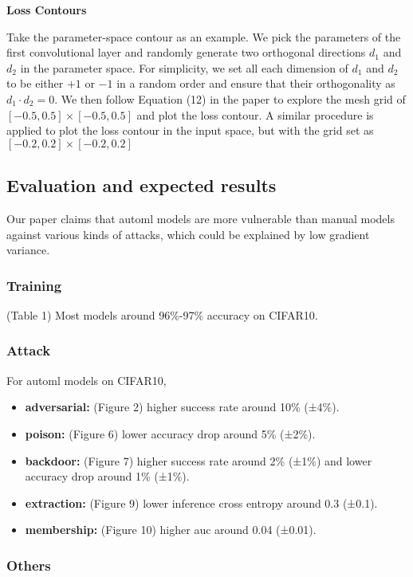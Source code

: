 \documentclass[letterpaper,twocolumn,10pt]{article}
\begin{document}
{{{{{\noindent
\textbf{Loss Contours}

Take the parameter-space contour as an example. We pick the parameters of the first convolutional layer and randomly generate two orthogonal directions $d_1$ and $d_2$ in the parameter space. For simplicity, we set all each dimension of $d_1$ and $d_2$ to be either $+1$ or $-1$ in a random order and ensure that their orthogonality as $d_1 \cdot d_2 = 0$. We then follow Equation (12) in the paper to explore the mesh grid of $[-0.5, 0.5] \times [-0.5, 0.5]$ and plot the loss contour. A similar procedure is applied to plot the loss contour in the input space, but with the grid set as $[-0.2, 0.2] \times [-0.2, 0.2]$

\subsection{Evaluation and expected results}

Our paper claims that automl models are more vulnerable than manual models against various kinds of attacks, which could be explained by low gradient variance. 
\subsubsection*{Training}
(Table 1) Most models around 96\%-97\% accuracy on CIFAR10.
\subsubsection*{Attack}
For automl models on CIFAR10,

{\small
\begin{itemize}
    \item {\bf adversarial: } (Figure 2) higher success rate around 10\% (±4\%).
    \item {\bf poison: } (Figure 6) lower accuracy drop around 5\% (±2\%).
    \item {\bf backdoor: } (Figure 7) higher success rate around 2\% (±1\%) and lower accuracy drop around 1\% (±1\%).
    \item {\bf extraction: } (Figure 9) lower inference cross entropy around 0.3 (±0.1).
    \item {\bf membership: } (Figure 10) higher auc around 0.04 (±0.01).
\end{itemize}

\subsubsection*{Others}

}}}}}}
\end{document}
